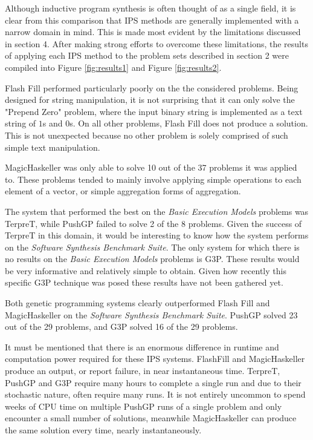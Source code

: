 Although inductive program synthesis is often thought of as a single field, it is clear from this comparison that IPS methods are generally implemented with a narrow domain in mind. This is made most evident by the limitations discussed in section 4. After making strong efforts to overcome these limitations, the results of applying each IPS method to the problem sets described in section 2 were compiled into Figure \ref{fig:results1} and Figure \ref{fig:results2}.

Flash Fill performed particularly poorly on the the considered problems. Being designed for string manipulation, it is not surprising that it can only solve the "Prepend Zero" problem, where the input binary string is implemented as a text string of $1$s and $0$s. On all other problems, Flash Fill does not produce a solution. This is not unexpected because no other problem is solely comprised of such simple text manipulation.

MagicHaskeller was only able to solve 10 out of the 37 problems it was applied to. These problems tended to mainly involve applying simple operations to each element of a vector, or simple aggregation forms of aggregation.

The system that performed the best on the \emph{Basic Execution Models} problems was TerpreT, while PushGP failed to solve 2 of the 8 problems. Given the success of TerpreT in this domain, it would be interesting to know how the system performs on the \emph{Software Synthesis Benchmark Suite}. The only system for which there is no results on the \emph{Basic Execution Models} problems is G3P. These results would be very informative and relatively simple to obtain. Given how recently this specific G3P technique was posed these results have not been gathered yet.

Both genetic programming systems clearly outperformed Flash Fill and MagicHaskeller on the \emph{Software Synthesis Benchmark Suite}. PushGP solved  23 out of the 29 problems, and G3P solved 16 of the 29 problems.

It must be mentioned that there is an enormous difference in runtime and computation power required for these IPS systems. FlashFill and MagicHaskeller produce an output, or report failure, in near instantaneous time. TerpreT, PushGP  and G3P require many hours to complete a single run and due to their stochastic nature, often require many runs. It is not entirely uncommon to spend weeks of CPU time on multiple PushGP runs of a single problem and only encounter a small number of solutions, meanwhile MagicHaskeller can produce the same solution every time, nearly instantaneously. 

